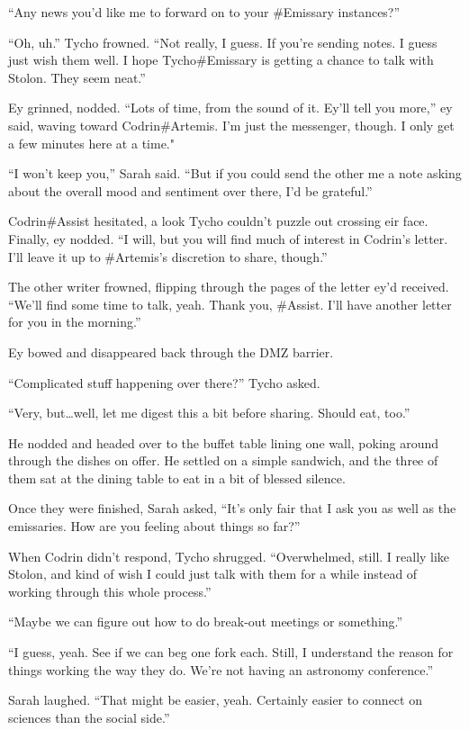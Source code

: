 ``Any news you'd like me to forward on to your \#Emissary instances?''

``Oh, uh.'' Tycho frowned. ``Not really, I guess. If you're sending notes. I guess just wish them well. I hope Tycho\#Emissary is getting a chance to talk with Stolon. They seem neat.''

Ey grinned, nodded. ``Lots of time, from the sound of it. Ey'll tell you more,'' ey said, waving toward Codrin\#Artemis. I'm just the messenger, though. I only get a few minutes here at a time."

``I won't keep you,'' Sarah said. ``But if you could send the other me a note asking about the overall mood and sentiment over there, I'd be grateful.''

Codrin\#Assist hesitated, a look Tycho couldn't puzzle out crossing eir face. Finally, ey nodded. ``I will, but you will find much of interest in Codrin's letter. I'll leave it up to \#Artemis's discretion to share, though.''

The other writer frowned, flipping through the pages of the letter ey'd received. ``We'll find some time to talk, yeah. Thank you, \#Assist. I'll have another letter for you in the morning.''

Ey bowed and disappeared back through the DMZ barrier.

``Complicated stuff happening over there?'' Tycho asked.

``Very, but\ldots well, let me digest this a bit before sharing. Should eat, too.''

He nodded and headed over to the buffet table lining one wall, poking around through the dishes on offer. He settled on a simple sandwich, and the three of them sat at the dining table to eat in a bit of blessed silence.

Once they were finished, Sarah asked, ``It's only fair that I ask you as well as the emissaries. How are you feeling about things so far?''

When Codrin didn't respond, Tycho shrugged. ``Overwhelmed, still. I really like Stolon, and kind of wish I could just talk with them for a while instead of working through this whole process.''

``Maybe we can figure out how to do break-out meetings or something.''

``I guess, yeah. See if we can beg one fork each. Still, I understand the reason for things working the way they do. We're not having an astronomy conference.''

Sarah laughed. ``That might be easier, yeah. Certainly easier to connect on sciences than the social side.''

